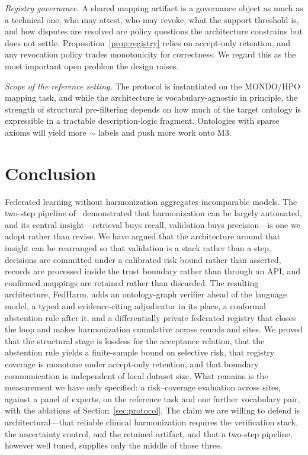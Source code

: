 \documentclass[conference]{IEEEtran}
\begin{document}
\textit{Registry governance.} A shared mapping artifact is a governance object as much as a technical one: who may attest, who may revoke, what the support threshold is, and how disputes are resolved are policy questions the architecture constrains but does not settle. Proposition~\ref{prop:registry} relies on accept-only retention, and any revocation policy trades monotonicity for correctness. We regard this as the most important open problem the design raises.

\textit{Scope of the reference setting.} The protocol is instantiated on the MONDO/HPO mapping task, and while the architecture is vocabulary-agnostic in principle, the strength of structural pre-filtering depends on how much of the target ontology is expressible in a tractable description-logic fragment. Ontologies with sparse axioms will yield more $\sim$ labels and push more work onto M3.

\section{Conclusion}

Federated learning without harmonization aggregates incomparable models. The two-step pipeline of~\cite{b1} demonstrated that harmonization can be largely automated, and its central insight---retrieval buys recall, validation buys precision---is one we adopt rather than revise. We have argued that the architecture around that insight can be rearranged so that validation is a stack rather than a step, decisions are committed under a calibrated risk bound rather than asserted, records are processed inside the trust boundary rather than through an API, and confirmed mappings are retained rather than discarded. The resulting architecture, FedHarm, adds an ontology-graph verifier ahead of the language model, a typed and evidence-citing adjudicator in its place, a conformal abstention rule after it, and a differentially private federated registry that closes the loop and makes harmonization cumulative across rounds and sites. We proved that the structural stage is lossless for the acceptance relation, that the abstention rule yields a finite-sample bound on selective risk, that registry coverage is monotone under accept-only retention, and that boundary communication is independent of local dataset size. What remains is the measurement we have only specified: a risk--coverage evaluation across sites, against a panel of experts, on the reference task and one further vocabulary pair, with the ablations of Section~\ref{sec:protocol}. The claim we are willing to defend is architectural---that reliable clinical harmonization requires the verification stack, the uncertainty control, and the retained artifact, and that a two-step pipeline, however well tuned, supplies only the middle of those three.
\end{document}
